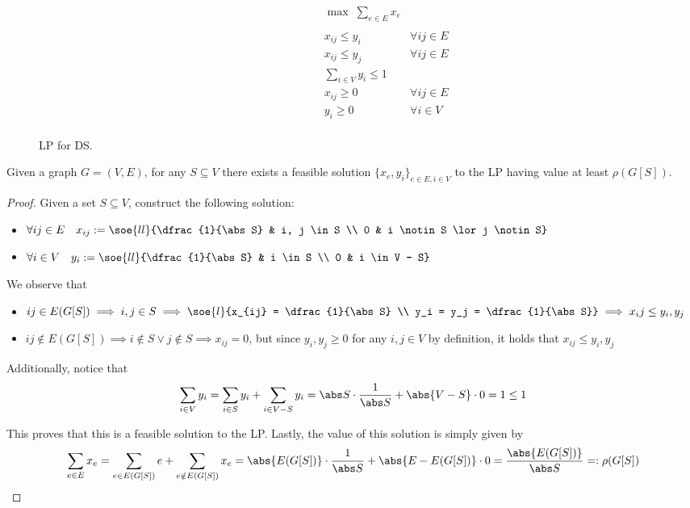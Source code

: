 \documentclass[a4paper, 12pt]{report}
\begin{document}
    \begin{figure}[H]
        \centering
        \[\begin{array}{ccl}
            \qquad\qquad\quad
            & \max \; \displaystyle \sum_{e \in E} {x_e} \\\\
            & x_{ij} \le y_i & \forall i j \in E \\
            & x_{ij} \le y_j & \forall i j \in E \\
            & \sum\limits_{i \in V}{y_i} \le 1 \\
            & x_{ij} \ge 0 & \forall i j \in E \\
            & y_i \ge 0 & \forall i \in V \\
        \end{array}\]
        \caption{LP for DS.}
        \label{ds lp}
    \end{figure}

    \begin{framedlem}{}
        Given a graph $G = (V, E)$, for any $S \subseteq V$ there exists a feasible solution $\{x_e, y_i\}_{e \in E, i \in V}$ to the LP having value at least $\rho(G[S])$.
    \end{framedlem}

    \begin{proof}
        Given a set $S \subseteq V$, construct the following solution:

        \begin{itemize}
            \item $\forall ij \in E \quad x_{ij} := \soe{ll}{\dfrac{1}{\abs S} & i, j \in S \\ 0 & i \notin S \lor j \notin S}$
            \item $\forall i \in V \quad y_i := \soe{ll}{\dfrac{1}{\abs S} & i \in S \\ 0 & i \in V - S}$
        \end{itemize}

        We observe that

        \begin{itemize}
            \item $ij \in E(G[S]) \implies i, j \in S \implies \soe{l}{x_{ij} = \dfrac{1}{\abs S} \\ y_i = y_j = \dfrac{1}{\abs S}} \implies x_ij \le y_i, y_j$
            \item $ij \notin E(G[S]) \implies i \notin S \lor j \notin S \implies x_{ij} = 0$, but since $y_i, y_j \ge 0$ for any $i, j \in V$ by definition, it holds that $x_{ij} \le y_i, y_j$
        \end{itemize}

        Additionally, notice that $$\sum_{i \in V}{y_i} = \sum_{i \in S}{y_i} + \sum_{i \in V - S}{y_i} = \abs S \cdot \dfrac{1}{\abs S} + \abs {V - S} \cdot 0 = 1 \le 1$$

        This proves that this is a feasible solution to the LP. Lastly, the value of this solution is simply given by $$\sum_{e \in E}{x_e} = \sum_{e \in E(G[S])}{e} + \sum_{e \notin E(G[S])}{x_e} = \abs{E(G[S])} \cdot \dfrac{1}{\abs S} + \abs{E - E(G [S])} \cdot 0 = \dfrac{\abs{E(G[S])}}{\abs S} =: \rho(G[S])$$
    \end{proof}
\end{document}
